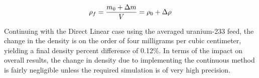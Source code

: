 \begin{equation} \hfill
\rho_f = \frac{m_0 + \Delta m}{V} = \rho_0 + \Delta \rho
\hfill\label{eq:new_rho_2} \end{equation}

Continuing with the Direct Linear case using the averaged uranium-233 feed, the change in the density is on the order of four milligrams per cubic centimeter, yielding a final density percent difference of 0.12\%. In terms of the impact on overall results, the change in density due to implementing the continuous method is fairly negligible unless the required simulation is of very high precision.









